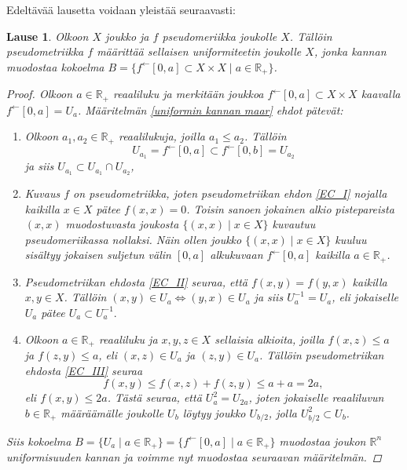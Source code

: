 \documentclass[12pt,a4paper,leqno]{report}
\newcommand{\R}{\mathbb{R}}
\theoremstyle{plain}
\newtheorem{lause}[equation]{Lause}
\theoremstyle{definition}
\theoremstyle{remark}
\begin{document}
Edeltävää lausetta voidaan yleistää seuraavasti: 
\begin{lause}\label{pseudo_uniformi_maar}
Olkoon $X$ joukko ja $f$ pseudomeriikka joukolle $X$. Tällöin pseudometriikka $f$ määrittää sellaisen uniformiteetin joukolle $X$, jonka kannan muodostaa kokoelma $B=\{ f^{\leftarrow}[0,a]\subset X\times X\mid a\in\R_+\}$.
\begin{proof}
Olkoon $a\in\R_+$ reaaliluku ja merkitään 
joukkoa $f^{\leftarrow}[0,a]\subset X\times X$ kaavalla $f^{\leftarrow}[0,a]=U_a$. 
Määritelmän \ref{uniformin kannan maar} ehdot pätevät:
\begin{enumerate} [label=(B\arabic*)]
\item %
Olkoon $a_1,a_2\in\R_+$ reaalilukuja, joilla $a_1\leq a_2$. 
Tällöin $$U_{a_1}=f^{\leftarrow}[0,a]\subset f^{\leftarrow}[0,b]=U_{a_2}$$ ja siis $U_{a_1}\subset U_{a_1}\cap U_{a_2}$,
\item%
Kuvaus $f$ on pseudometriikka, joten pseudometriikan ehdon \ref{EC_I} nojalla kaikilla $x\in X$ pätee $f(x,x)=0$. Toisin sanoen jokainen alkio pistepareista $(x,x)$ muodostuvasta joukosta $\{(x,x)\mid x\in X\}$ kuvautuu pseudomeriikassa nollaksi. Näin ollen joukko $\{(x,x)\mid x\in X\}$ kuuluu sisältyy jokaisen suljetun välin $[0,a]$ alkukuvaan $f^{\leftarrow}[0,a]$ kaikilla $a\in \R_+$.
\item%
Pseudometriikan ehdosta \ref{EC_II} seuraa, että $f(x,y)=f(y,x)$ kaikilla $x,y\in X$. 
Tällöin $(x,y)\in U_a\Leftrightarrow (y,x)\in U_a$ ja siis $U_a^{-1}=U_a$, eli jokaiselle $U_a$ pätee $U_a\subset U_a^{-1}. $
\item%
Olkoon $a\in\R_+$ reaaliluku ja $x,y,z\in X$ sellaisia alkioita, joilla $f(x,z)\leq a$ ja $f(z,y)\leq a$, eli $(x,z)\in U_a$ ja $(z,y)\in U_a$.
Tällöin pseudometriikan ehdosta \ref{EC_III} seuraa 
$$f(x,y)\leq f(x,z)+f(z,y)\leq a+a=2a,$$ 
eli $f(x,y)\leq 2a$. Tästä seuraa, että $U_a^2=U_{2a} $, joten jokaiselle reaaliluvun $b\in\R_+$ määräämälle joukolle $U_b$ löytyy joukko $U_{b/2}$, jolla $U_{b/2}^2\subset U_b$.
\end{enumerate}
Siis kokoelma $B=\{U_a\mid a\in\R_+\}
=\{f^{\leftarrow}[0,a]\mid a\in\R_+\}
$ muodostaa joukon $\R^n$ uniformisuuden kannan ja voimme nyt muodostaa seuraavan määritelmän.
\end{proof}
\end{lause}
\end{document}
